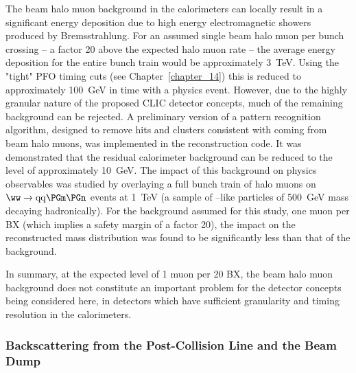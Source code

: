 The beam halo muon background in the calorimeters can locally result in a significant energy deposition due to high energy 
electromagnetic showers produced by Bremsstrahlung. For an assumed single beam halo muon per bunch 
crossing -- a factor 20 above the expected halo muon rate -- the
average energy deposition for the entire bunch train would be approximately 3~TeV. 
Using the "tight" \acs{PFO} timing cuts (see Chapter~\ref{chapter_14}) this is reduced to approximately 100~GeV in time 
with a physics event. However, due to the highly granular nature of the proposed CLIC detector concepts, much of 
the remaining background can be rejected. A preliminary version of a 
pattern recognition algorithm, designed to remove hits and 
clusters consistent with coming from beam halo muons, was implemented in the \pandora reconstruction code.
It was demonstrated that the residual calorimeter background can be reduced to the level of approximately 10~GeV.
The impact of this background on physics observables was studied by overlaying a full bunch train of halo muons 
on $\ww \to \mathrm{qq} \PGm \PGn$ events at 1~TeV (a sample of \PW--like particles of 500~GeV mass decaying hadronically). 
For the background assumed for this study, one muon per BX (which implies a safety margin of a factor 20), 
the impact on the reconstructed
\PW mass distribution was found to be significantly less than that of the \gghadrons
background. 

In summary, at the expected level of 1 muon per 20 BX, the beam halo muon background does
not constitute an important problem for the detector concepts being
considered here, \ie in detectors which have sufficient granularity and timing
resolution in the calorimeters. 

\subsubsection{Backscattering from the Post-Collision Line and the Beam Dump\label{sec:chapter3:environment:backscattering}}

